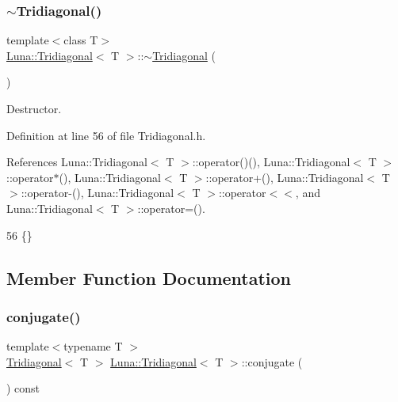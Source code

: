 \subsubsection{\texorpdfstring{$\sim$\+Tridiagonal()}{~Tridiagonal()}}
{\footnotesize\ttfamily template$<$class T$>$ \\
\hyperlink{classLuna_1_1Tridiagonal}{Luna\+::\+Tridiagonal}$<$ T $>$\+::$\sim$\hyperlink{classLuna_1_1Tridiagonal}{Tridiagonal} (\begin{DoxyParamCaption}{ }\end{DoxyParamCaption})\hspace{0.3cm}{\ttfamily [inline]}}



Destructor. 



Definition at line 56 of file Tridiagonal.\+h.



References Luna\+::\+Tridiagonal$<$ T $>$\+::operator()(), Luna\+::\+Tridiagonal$<$ T $>$\+::operator$\ast$(), Luna\+::\+Tridiagonal$<$ T $>$\+::operator+(), Luna\+::\+Tridiagonal$<$ T $>$\+::operator-\/(), Luna\+::\+Tridiagonal$<$ T $>$\+::operator$<$$<$, and Luna\+::\+Tridiagonal$<$ T $>$\+::operator=().


\begin{DoxyCode}
56 \{\}
\end{DoxyCode}


\subsection{Member Function Documentation}
\mbox{\label{classLuna_1_1Tridiagonal_a0338abe2f0237df28f96324a7d11d4df}} 
\subsubsection{\texorpdfstring{conjugate()}{conjugate()}}
{\footnotesize\ttfamily template$<$typename T $>$ \\
\hyperlink{classLuna_1_1Tridiagonal}{Tridiagonal}$<$ T $>$ \hyperlink{classLuna_1_1Tridiagonal}{Luna\+::\+Tridiagonal}$<$ T $>$\+::conjugate (\begin{DoxyParamCaption}{ }\end{DoxyParamCaption}) const\hspace{0.3cm}{\ttfamily [inline]}}



